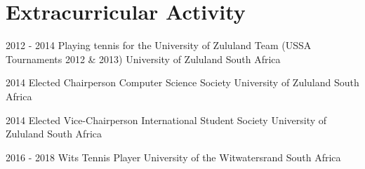 \documentclass[letterpaper]{moderncv}        %
\begin{document}
\section{Extracurricular Activity}
\cventry
{2012 - 2014}
{Playing tennis for the University of Zululand Team (USSA Tournaments 2012 \& 2013)}
{University	of Zululand}
{South Africa}
{}
{}

\cventry
{2014}
{Elected Chairperson Computer Science Society}
{University	of Zululand}
{South Africa}
{}
{}

\cventry
{2014}
{Elected Vice-Chairperson International Student Society}
{University	of Zululand}
{South Africa}
{}
{}

\cventry
{2016 - 2018}
{Wits Tennis Player}
{University	of the Witwatersrand}
{South Africa}
{}
{}
\end{document}

